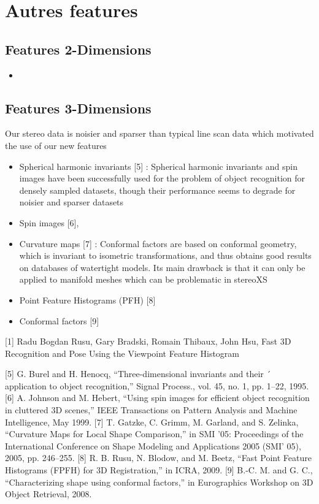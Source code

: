 \section{Autres features}


\subsection{Features 2-Dimensions}
    \begin{itemize}
         \item 
    \end{itemize}



\subsection{Features 3-Dimensions}
Our stereo data is noisier and sparser than typical line scan data which
motivated the use of our new features

    \begin{itemize}
        \item Spherical harmonic invariants [5] : Spherical harmonic invariants and spin images have been
          successfully used for the problem of object recognition for
          densely sampled datasets, though their performance seems
          to degrade for noisier and sparser datasets

        \item Spin images [6], 
        \item Curvature maps [7] :  Conformal factors are
          based on conformal geometry, which is invariant to isometric
          transformations, and thus obtains good results on databases
          of watertight models. Its main drawback is that it can only
          be applied to manifold meshes which can be problematic
          in stereoXS
        \item Point Feature Histograms (PFH) [8]
        \item Conformal factors [9]
    \end{itemize}

[1] Radu Bogdan Rusu, Gary Bradski, Romain Thibaux, John Hsu,
Fast 3D Recognition and Pose Using the Viewpoint Feature Histogram

[5] G. Burel and H. Henocq, “Three-dimensional invariants and their ´
application to object recognition,” Signal Process., vol. 45, no. 1, pp.
1–22, 1995.
[6] A. Johnson and M. Hebert, “Using spin images for efficient object
recognition in cluttered 3D scenes,” IEEE Transactions on Pattern
Analysis and Machine Intelligence, May 1999.
[7] T. Gatzke, C. Grimm, M. Garland, and S. Zelinka, “Curvature Maps
for Local Shape Comparison,” in SMI ’05: Proceedings of the International
Conference on Shape Modeling and Applications 2005 (SMI’
05), 2005, pp. 246–255.
[8] R. B. Rusu, N. Blodow, and M. Beetz, “Fast Point Feature Histograms
(FPFH) for 3D Registration,” in ICRA, 2009.
[9] B.-C. M. and G. C., “Characterizing shape using conformal factors,”
in Eurographics Workshop on 3D Object Retrieval, 2008.
